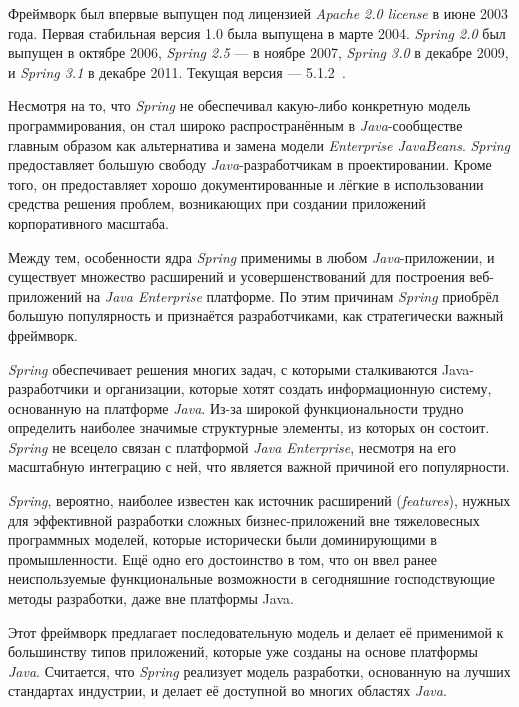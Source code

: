 Фреймворк был впервые выпущен под лицензией \textit{Apache 2.0 license} в июне 2003 года. Первая стабильная версия 1.0 была выпущена в марте 2004. \textit{Spring 2.0} был выпущен в октябре 2006, \textit{Spring 2.5} — в ноябре 2007, \textit{Spring 3.0} в декабре 2009, и \textit{Spring 3.1} в декабре 2011. Текущая версия — 5.1.2~\cite{spring}.

Несмотря на то, что \textit{Spring} не обеспечивал какую-либо конкретную модель программирования, он стал широко распространённым в \textit{Java}-сообществе главным образом как альтернатива и замена модели \textit{Enterprise JavaBeans}. \textit{Spring} предоставляет большую свободу \textit{Java}-разработчикам в проектировании. Кроме того, он предоставляет хорошо документированные и лёгкие в использовании средства решения проблем, возникающих при создании приложений корпоративного масштаба.

Между тем, особенности ядра \textit{Spring} применимы в любом \textit{Java}-приложении, и существует множество расширений и усовершенствований для построения веб-приложений на \textit{Java Enterprise} платформе. По этим причинам \textit{Spring} приобрёл большую популярность и признаётся разработчиками, как стратегически важный фреймворк.

\textit{Spring} обеспечивает решения многих задач, с которыми сталкиваются Java-разработчики и организации, которые хотят создать информационную систему, основанную на платформе \textit{Java}. Из-за широкой функциональности трудно определить наиболее значимые структурные элементы, из которых он состоит. \textit{Spring} не всецело связан с платформой \textit{Java Enterprise}, несмотря на его масштабную интеграцию с ней, что является важной причиной его популярности.

\textit{Spring}, вероятно, наиболее известен как источник расширений (\textit{features}), нужных для эффективной разработки сложных бизнес-приложений вне тяжеловесных программных моделей, которые исторически были доминирующими в промышленности. Ещё одно его достоинство в том, что он ввел ранее неиспользуемые функциональные возможности в сегодняшние господствующие методы разработки, даже вне платформы Java.

Этот фреймворк предлагает последовательную модель и делает её применимой к большинству типов приложений, которые уже созданы на основе платформы \textit{Java}. Считается, что \textit{Spring} реализует модель разработки, основанную на лучших стандартах индустрии, и делает её доступной во многих областях \textit{Java}.

